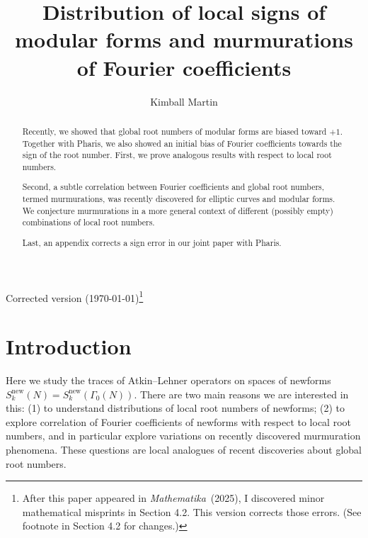 \documentclass[11pt]{amsart}
\newcommand{\new}{\mathrm{new}}
\numberwithin{lem}{section}
\theoremstyle{remark}
\theoremstyle{definition}
\numberwithin{equation}{section}
\begin{document}
\title{Distribution of local signs of modular forms and murmurations of Fourier coefficients}
\author{Kimball Martin}
\address{Department of Mathematics, University of Oklahoma, Norman, OK 73019 USA}

\address{Department of Mathematics $\cdot$ International Research and Education Center, Graduate School of Science, Osaka Metropolitan University, Osaka 558-8585, Japan}



\maketitle

Corrected version (\today)\footnote{After this paper appeared in \emph{Mathematika}\ (2025), I discovered minor mathematical misprints in Section 4.2.  This version corrects those errors.  (See footnote in Section 4.2 for changes.)}

\begin{abstract}
Recently, we showed that global root numbers of modular forms are biased toward $+1$.  Together with Pharis, we also showed an initial bias of Fourier coefficients towards the sign of the root number.  First, we prove analogous results with respect to local root numbers.

Second, a subtle correlation between Fourier coefficients and global root numbers, termed murmurations, was recently discovered for elliptic curves and modular forms.  We conjecture murmurations in a more general context of different (possibly empty) combinations of local root numbers.

Last, an appendix corrects a sign error in our joint paper with Pharis.
\end{abstract}


\section{Introduction}


Here we study the traces of Atkin--Lehner operators on spaces of newforms $S_k^\new(N) = S_k^\new(\Gamma_0(N))$.  There are two main reasons we are interested in this: (1) to understand distributions of local root numbers of newforms; (2) to explore correlation of Fourier coefficients of newforms with respect to local root numbers, and in particular explore variations on recently discovered murmuration phenomena.  These questions are local analogues of recent discoveries about global root numbers.
\end{document}
